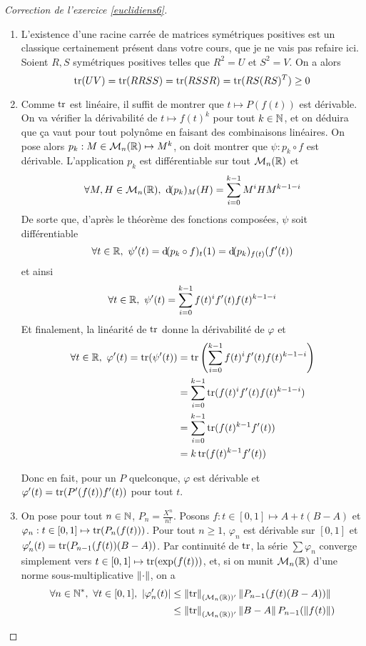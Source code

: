 \begin{proof}[Correction de l'exercice \ref{euclidiens6}]
	\begin{enumerate}
		\item L'existence d'une racine carrée de matrices symétriques positives est un classique certainement présent dans votre cours, que je ne vais pas refaire ici. 
		Soient $R,S$ symétriques positives telles que $R^2=U$ et $S^2=V$.
		On a alors 
		\[
			\operatorname{tr}(UV)=\operatorname{tr}(RRSS)=\operatorname{tr}(RSSR)=\operatorname{tr}(RS(RS)^T)\geq 0
		\]
		\item Comme $\operatorname{tr}$ est linéaire, il suffit de montrer que $t\mapsto P(f(t))$ est dérivable.
		On va vérifier la dérivabilité de $t\mapsto f(t)^k$ pour tout $k\in\operatorname{\mathbb N}$, 
		et on déduira que ça vaut pour tout polynôme en faisant des combinaisons linéaires.
		On pose alors $p_k:M\in\mathcal M_n(\operatorname{\mathbb R})\mapsto M^k$, on doit montrer que $\psi : p_k\circ f$ est dérivable. 
		L'application $p_k$ est différentiable sur tout $\mathcal M_n(\operatorname{\mathbb R})$ et 
		\[
			\forall M,H\in\mathcal M_n(\operatorname{\mathbb R}),\ \operatorname{d\hskip-1.5pt}(p_k)_M(H)=\sum_{i=0}^{k-1}M^iHM^{k-1-i}
		\]
		De sorte que, d'après le théorème des fonctions composées, $\psi$ soit différentiable 
		\[
			\forall t\in\R,\ \psi'(t)=\dd(p_k\circ f)_t(1)=\dd(p_k)_{f(t)}(f'(t))
		\]
		et ainsi
		\[
			\forall t\in\R,\ \psi'(t)=\sum_{i=0}^{k-1}f(t)^if'(t)f(t)^{k-1-i}	
		\]
		Et finalement, la linéarité de $\operatorname{tr}$ donne la dérivabilité de $\varphi$ et 
		\begin{align*}
			\forall t\in\R,\ \varphi'(t)=\tr(\psi'(t))  &=\tr\left(\sum_{i=0}^{k-1}f(t)^if'(t)f(t)^{k-1-i}\right)\\
														&=\sum_{i=0}^{k-1}\tr(f(t)^if'(t)f(t)^{k-1-i})\\
														&=\sum_{i=0}^{k-1}\tr(f(t)^{k-1}f'(t))\\
														&=k\tr(f(t)^{k-1}f'(t))
		\end{align*}

		Donc en fait, pour un $P$ quelconque, $\varphi$ est dérivable et $\varphi'(t)=\operatorname{tr}(P'(f(t))f'(t))$ pour tout $t$.

		\item On pose pour tout $n\in\operatorname{\mathbb N}$, $P_n=\frac{X^n}{n!}$.
		Posons $f:t\in[0,1]\mapsto A + t(B-A)$ et $\varphi_n:t\in[0,1]\mapsto\operatorname{tr}(P_n(f(t)))$.
		Pour tout $n\geq 1$, $\varphi_n$ est dérivable sur $[0,1]$ et $\varphi_n'(t)=\operatorname{tr}(P_{n-1}(f(t))(B-A))$.
		Par continuité de $\operatorname{tr}$, la série $\sum\varphi_n$ converge simplement vers $t\in[0,1]\mapsto\operatorname{tr}(\exp(f(t)))$, et,
		si on munit $\mathcal M_n(\operatorname{\mathbb R})$ d'une norme sous-multiplicative $\left\lVert \cdot\right\rVert$, on a 
		\begin{align*}
			\forall n\in\operatorname{\mathbb N}^*,\ \forall t\in[0,1],\ |\varphi_n'(t)| &\leq\left\lVert \operatorname{tr}\right\rVert_{(\mathcal M_n(\operatorname{\mathbb R}))'}	\left\lVert P_{n-1}(f(t)(B-A))\right\rVert\\
																		&\leq\left\lVert \operatorname{tr}\right\rVert_{(\mathcal M_n(\operatorname{\mathbb R}))'}\left\lVert B-A\right\rVert P_{n-1}(\left\lVert f(t)\right\rVert) 
		\end{align*}


\end{enumerate}
\end{proof}
